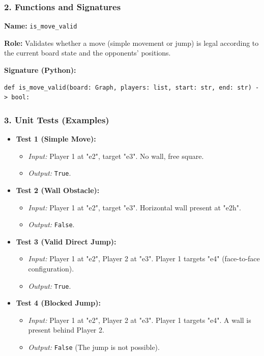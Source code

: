 \documentclass[a4paper]{article}
\begin{document}
\subsubsection*{2. Functions and Signatures}

\textbf{Name:} \texttt{is\_move\_valid}  

\textbf{Role:} Validates whether a move (simple movement or jump) is legal according to the current board state and the opponents’ positions.

\textbf{Signature (Python):}
\begin{verbatim}
def is_move_valid(board: Graph, players: list, start: str, end: str) -> bool:
\end{verbatim}


\subsubsection*{3. Unit Tests (Examples)}
\begin{itemize}
    \item \textbf{Test 1 (Simple Move):}
    \begin{itemize}
        \item \textit{Input:} Player 1 at "e2", target "e3". No wall, free square.
        \item \textit{Output:} \texttt{True}.
    \end{itemize}

    \item \textbf{Test 2 (Wall Obstacle):}
    \begin{itemize}
        \item \textit{Input:} Player 1 at "e2", target "e3". Horizontal wall present at "e2h".
        \item \textit{Output:} \texttt{False}.
    \end{itemize}

    \item \textbf{Test 3 (Valid Direct Jump):}
    \begin{itemize}
        \item \textit{Input:} Player 1 at "e2", Player 2 at "e3". Player 1 targets "e4" (face-to-face configuration).
        \item \textit{Output:} \texttt{True}.
    \end{itemize}

    \item \textbf{Test 4 (Blocked Jump):}
    \begin{itemize}
        \item \textit{Input:} Player 1 at "e2", Player 2 at "e3". Player 1 targets "e4". A wall is present behind Player 2.
        \item \textit{Output:} \texttt{False} (The jump is not possible).
    \end{itemize}
\end{itemize}
\end{document}
